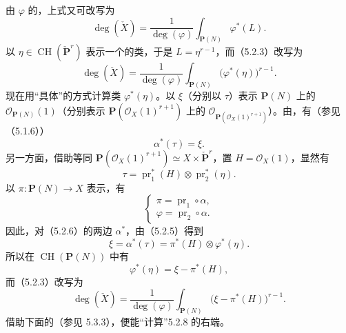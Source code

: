 由 $\varphi$ 的，上式又可改写为
\[
\deg(\check X)=\frac1{\deg(\varphi)}
\int_{\mathbf P(N)}\varphi^*(L).
\tag{5.2.3}
\]
以 $\eta\in\operatorname{CH}(\check{\mathbf P}^{r})$ 表示一个的类，于是 $L=\eta^{r-1}$，而（5.2.3）改写为
\[
\deg(\check X)=\frac1{\deg(\varphi)}
\int_{\mathbf P(N)}\bigl(\varphi^*(\eta)\bigr)^{r-1}.
\tag{5.2.4}
\]
现在用“具体”的方式计算类 $\varphi^*(\eta)$。以 $\xi$（分别以 $\tau$）表示 $\mathbf P(N)$ 上的 $\mathcal O_{\mathbf P(N)}(1)$（分别表示 $\mathbf P(\mathcal O_X(1)^{r+1})$ 上的 $\mathcal O_{\mathbf P(\mathcal O_X(1)^{r+1})}$）。由，有（参见（5.1.6））
\[
\alpha^*(\tau)=\xi.
\tag{5.2.5}
\]
另一方面，借助等同
$\mathbf P(\mathcal O_X(1)^{r+1})\simeq X\times\check{\mathbf P}^{r}$，置 $H=\mathcal O_X(1)$，显然有
\[
\tau=\operatorname{pr}_1^*(H)\otimes\operatorname{pr}_2^*(\eta).
\tag{5.2.6}
\]
以 $\pi:\mathbf P(N)\longrightarrow X$ 表示，有
\[
\begin{cases}
\pi=\operatorname{pr}_1\circ\alpha,\\
\varphi=\operatorname{pr}_2\circ\alpha.
\end{cases}
\]
因此，对（5.2.6）的两边 $\alpha^*$，由（5.2.5）得到
\[
\xi=\alpha^*(\tau)=\pi^*(H)\otimes\varphi^*(\eta).
\tag{5.2.6}
\]
所以在 $\operatorname{CH}(\mathbf P(N))$ 中有
\[
\varphi^*(\eta)=\xi-\pi^*(H),
\tag{5.2.7}
\]
而（5.2.3）改写为
\[
\deg(\check X)=\frac1{\deg(\varphi)}
\int_{\mathbf P(N)}\bigl(\xi-\pi^*(H)\bigr)^{r-1}.
\tag{5.2.8}
\]
借助下面的（参见 5.3.3），便能“计算”5.2.8 的右端。

